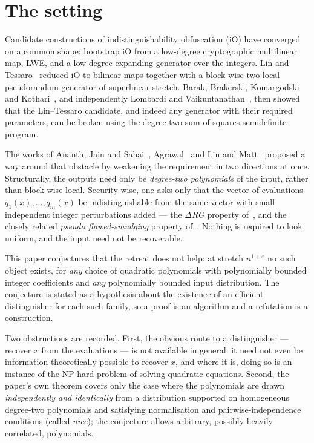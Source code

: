 \documentclass{aicr-conjecture}
\begin{document}
\section{The setting}\label{sec:setting}

Candidate constructions of indistinguishability obfuscation (iO) have
converged on a common shape: bootstrap iO from a low-degree
cryptographic multilinear map, LWE, and a low-degree expanding
generator over the integers. Lin and Tessaro~\cite{LT} reduced iO to
bilinear maps together with a block-wise two-local pseudorandom
generator of superlinear stretch. Barak, Brakerski, Komargodski and
Kothari~\cite{BBKK}, and independently Lombardi and
Vaikuntanathan~\cite{LV}, then showed that the Lin--Tessaro candidate,
and indeed any generator with their required parameters, can be broken
using the degree-two sum-of-squares semidefinite program.

The works of Ananth, Jain and Sahai~\cite{AJS}, Agrawal~\cite{Agr18}
and Lin and Matt~\cite{LM} proposed a way around that obstacle by
weakening the requirement in two directions at once. Structurally, the
outputs need only be \emph{degree-two polynomials} of the input, rather
than block-wise local. Security-wise, one asks only that the vector of
evaluations $q_1(x), \dots, q_m(x)$ be indistinguishable from the same
vector with small independent integer perturbations added --- the
\emph{$\Delta$RG} property of~\cite{AJS}, and the closely related
\emph{pseudo flawed-smudging} property of~\cite{LM}. Nothing is
required to look uniform, and the input need not be recoverable.

This paper conjectures that the retreat does not help: at stretch
$n^{1+\varepsilon}$ no such object exists, for \emph{any} choice of
quadratic polynomials with polynomially bounded integer coefficients
and \emph{any} polynomially bounded input distribution. The conjecture
is stated as a hypothesis about the existence of an efficient
distinguisher for each such family, so a proof is an algorithm and a
refutation is a construction.

Two obstructions are recorded. First, the obvious route to a
distinguisher --- recover $x$ from the evaluations --- is not available
in general: it need not even be information-theoretically possible to
recover $x$, and where it is, doing so is an instance of the NP-hard
problem of solving quadratic equations. Second, the paper's own theorem
covers only the case where the polynomials are drawn
\emph{independently and identically} from a distribution supported on
homogeneous degree-two polynomials and satisfying normalisation and
pairwise-independence conditions (called \emph{nice}); the conjecture
allows arbitrary, possibly heavily correlated, polynomials.
\end{document}
